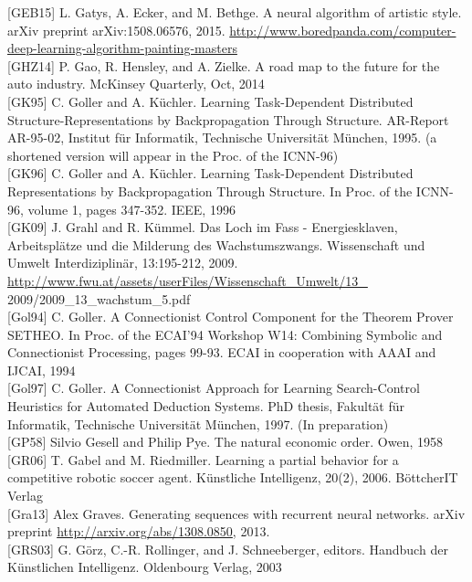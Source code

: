 \documentclass[10pt]{article}
\begin{document}
[GEB15] L. Gatys, A. Ecker, and M. Bethge. A neural algorithm of artistic style. arXiv preprint arXiv:1508.06576, 2015. \href{http://www.boredpanda.com/computer-deep-learning-algorithm-painting-masters}{http://www.boredpanda.com/computer-deep-learning-algorithm-painting-masters}\\[0pt]
[GHZ14] P. Gao, R. Hensley, and A. Zielke. A road map to the future for the auto industry. McKinsey Quarterly, Oct, 2014\\[0pt]
[GK95] C. Goller and A. Küchler. Learning Task-Dependent Distributed Structure-Representations by Backpropagation Through Structure. AR-Report AR-95-02, Institut für Informatik, Technische Universität München, 1995. (a shortened version will appear in the Proc. of the ICNN-96)\\[0pt]
[GK96] C. Goller and A. Küchler. Learning Task-Dependent Distributed Representations by Backpropagation Through Structure. In Proc. of the ICNN-96, volume 1, pages 347-352. IEEE, 1996\\[0pt]
[GK09] J. Grahl and R. Kümmel. Das Loch im Fass - Energiesklaven, Arbeitsplätze und die Milderung des Wachstumszwangs. Wissenschaft und Umwelt Interdiziplinär, 13:195-212, 2009. \href{http://www.fwu.at/assets/userFiles/Wissenschaft_Umwelt/13_}{http://www.fwu.at/assets/userFiles/Wissenschaft\_Umwelt/13\_} 2009/2009\_13\_wachstum\_5.pdf\\[0pt]
[Gol94] C. Goller. A Connectionist Control Component for the Theorem Prover SETHEO. In Proc. of the ECAI'94 Workshop W14: Combining Symbolic and Connectionist Processing, pages 99-93. ECAI in cooperation with AAAI and IJCAI, 1994\\[0pt]
[Gol97] C. Goller. A Connectionist Approach for Learning Search-Control Heuristics for Automated Deduction Systems. PhD thesis, Fakultät für Informatik, Technische Universität München, 1997. (In preparation)\\[0pt]
[GP58] Silvio Gesell and Philip Pye. The natural economic order. Owen, 1958\\[0pt]
[GR06] T. Gabel and M. Riedmiller. Learning a partial behavior for a competitive robotic soccer agent. Künstliche Intelligenz, 20(2), 2006. BöttcherIT Verlag\\[0pt]
[Gra13] Alex Graves. Generating sequences with recurrent neural networks. arXiv preprint \href{http://arxiv.org/abs/1308.0850}{http://arxiv.org/abs/1308.0850}, 2013.\\[0pt]
[GRS03] G. Görz, C.-R. Rollinger, and J. Schneeberger, editors. Handbuch der Künstlichen Intelligenz. Oldenbourg Verlag, 2003\\[0pt]
\end{document}
